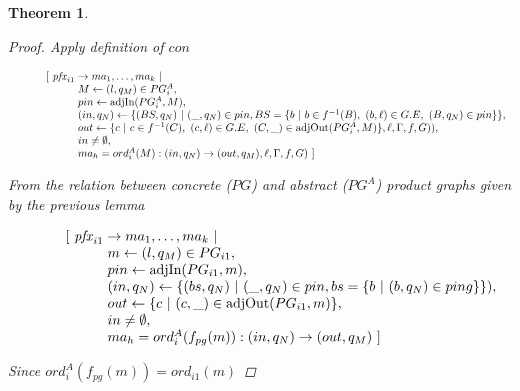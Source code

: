 \documentclass[twocolumn, openany]{sig-alternate-10pt}
\newtheorem{thm}{Theorem}
\begin{document}
\begin{thm}
\begin{proof}
  Apply definition of $con$

  \[ \begin{array}{l}
     ~~~~~~~~~ [~ \mathit{pfx}_{i1} \rightarrow ma_1, \dots, ma_k ~\vert~ \\
     ~~~~~~~~~~~~~~~~~~ M \leftarrow (l,q_M) \in PG^A_i, \\
     ~~~~~~~~~~~~~~~~~~ pin \leftarrow \text{adjIn}(PG^A_i,M), \\
     ~~~~~~~~~~~~~~~~~~ (in,q_N) \leftarrow \{ (BS,q_N) ~\vert~ (\_,q_N) \in pin, BS=\{b ~\vert~ b \in f^{-1}(B),~ (b,\ell) \in G.E,~ (B,q_N) \in pin \} \}, \\
     ~~~~~~~~~~~~~~~~~~ out \leftarrow \{c~\vert~ c \in f^{-1}(C),~ (c,\ell) \in G.E,~ (C,\_) \in \text{adjOut}(PG^A_i,M) \},\ell,\Gamma,f,G)), \\
     ~~~~~~~~~~~~~~~~~~ in \neq \emptyset, \\
     ~~~~~~~~~~~~~~~~~~ ma_h = ord^A_i(M) : (in,q_N) \rightarrow (out,q_M),\ell,\Gamma,f,G) ~] \\
  \end{array} \]%

  From the relation between concrete ($PG$) and abstract ($PG^A$) product graphs given by the previous lemma

  \[ \begin{array}{l}
     ~~~~~~~~~ [~ \mathit{pfx}_{i1} \rightarrow ma_1, \dots, ma_k ~\vert~ \\
     ~~~~~~~~~~~~~~~~~~ m \leftarrow (l,q_M) \in PG_{i1}, \\
     ~~~~~~~~~~~~~~~~~~ pin \leftarrow \text{adjIn}(PG_{i1},m), \\
     ~~~~~~~~~~~~~~~~~~ (in,q_N) \leftarrow \{ (bs,q_N) ~\vert~ (\_,q_N) \in pin, bs=\{ b ~\vert~ (b,q_N) \in ping \} \}), \\
     ~~~~~~~~~~~~~~~~~~ out \leftarrow \{ c ~\vert~ (c,\_) \in \text{adjOut}(PG_{i1},m) \}, \\
     ~~~~~~~~~~~~~~~~~~ in \neq \emptyset, \\
     ~~~~~~~~~~~~~~~~~~ ma_h = ord^A_i(f_{pg}(m)) : (in,q_N) \rightarrow (out,q_M) ~] \\
  \end{array} \]%

  Since $ord^A_i(f_{pg}(m)) = ord_{i1}(m)$


\end{proof}
\end{thm}
\end{document}
